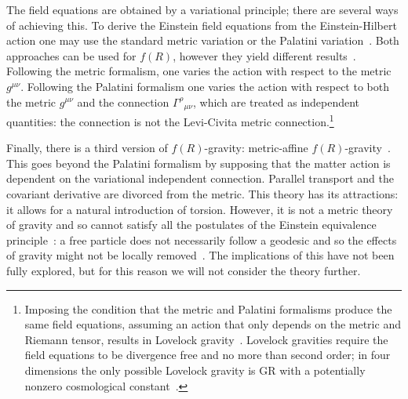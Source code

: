 \documentclass[aps,prd,amsfonts,amssymb,amsmath,nofootinbib,reprint,showpacs]{revtex4-1}
\begin{document}
The field equations are obtained by a variational principle; there are several ways of achieving this. To derive the Einstein field equations from the Einstein-Hilbert action one may use the standard metric variation or the Palatini variation~\cite{Misner1973}. Both approaches can be used for $f(R)$, however they yield different results~\cite{Sotiriou2010, DeFelice2010}. Following the metric formalism, one varies the action with respect to the metric $g^{\mu\nu}$. Following the Palatini formalism one varies the action with respect to both the metric $g^{\mu\nu}$ and the connection ${\Gamma^\rho}_{\mu\nu}$, which are treated as independent quantities: the connection is not the Levi-Civita metric connection.\footnote{Imposing the condition that the metric and Palatini formalisms produce the same field equations, assuming an action that only depends on the metric and Riemann tensor, results in Lovelock gravity~\cite{Exirifard2008}. Lovelock gravities require the field equations to be divergence free and no more than second order; in four dimensions the only possible Lovelock gravity is GR with a potentially nonzero cosmological constant~\cite{Lovelock1970, Lovelock1971, Lovelock1972}.}

Finally, there is a third version of $f(R)$-gravity: metric-affine $f(R)$-gravity~\cite{Sotiriou2007, Sotiriou2007b}. This goes beyond the Palatini formalism by supposing that the matter action is dependent on the variational independent connection. Parallel transport and the covariant derivative are divorced from the metric. This theory has its attractions: it allows for a natural introduction of torsion. However, it is not a metric theory of gravity and so cannot satisfy all the postulates of the Einstein equivalence principle~\cite{Will2006}: a free particle does not necessarily follow a geodesic and so the effects of gravity might not be locally removed~\cite{Exirifard2008}. The implications of this have not been fully explored, but for this reason we will not consider the theory further.
\end{document}

